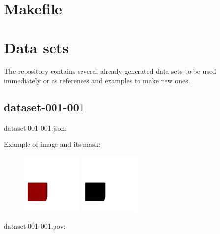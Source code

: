 \section{Makefile}

\begin{scriptsize}
\begin{ttfamily}

\end{ttfamily}
\end{scriptsize}

\section{Data sets}

The repository contains several already generated data sets to be used immediately or as references and examples to make new ones.

\subsection{dataset-001-001}

dataset-001-001.json:
\begin{scriptsize}
\begin{ttfamily}

\end{ttfamily}
\end{scriptsize}

Example of image and its mask:
\begin{center}
\begin{figure}[H]
\centering\includegraphics[width=3cm]{./img-001-001.png}
\centering\includegraphics[width=3cm]{./mask-001-001.png}
\end{figure}
\end{center}

dataset-001-001.pov:
\begin{scriptsize}
\begin{ttfamily}

\end{ttfamily}
\end{scriptsize}

